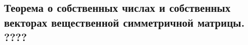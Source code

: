 {
\subsection{Теорема о собственных числах и собственных векторах вещественной симметричной матрицы. ????}
}